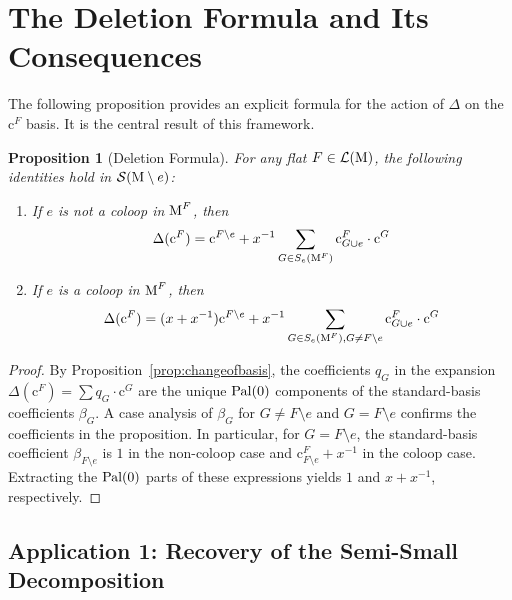 \documentclass[11pt]{article}
\newcommand{\calS}{\mathcal{S}}
\newcommand{\M}{\normalfont\text{M}}
\newcommand{\Cbasis}[1]{\mathrm{c}^{#1}}
\newcommand{\CbasisSub}[2]{\mathrm{c}^{#1}_{#2}}
\newcommand{\pal}{\normalfont\text{Pal}}
\newtheorem{proposition}[theorem]{Proposition}
\theoremstyle{remark}
\begin{document}
\section{The Deletion Formula and Its Consequences}

The following proposition provides an explicit formula for the action of \(\Delta\) on the \(\Cbasis{F}\) basis. It is the central result of this framework.

\begin{proposition}[Deletion Formula]\label{prop:imageofDeltaCbasis}
    For any flat \(F \in \mathcal{L}(\M)\), the following identities hold in \(\calS(\M \setminus e)\):
    \begin{enumerate}
        \item If \(e\) is not a coloop in \(\M^F\), then
        \begin{equation}\label{eq:imageofDeltaCbasisnoncoloop}
            \Delta(\Cbasis{F}) = \Cbasis{F \setminus e} + x^{-1}\sum_{G \in S_e(\M^F)}\CbasisSub{F}{G\cup e} \cdot \Cbasis{G}
        \end{equation}
        \item If \(e\) is a coloop in \(\M^F\), then
        \begin{equation}\label{eq:imageofDeltaCbasiscoloop}
            \Delta(\Cbasis{F}) = (x+x^{-1})\Cbasis{F \setminus e} + x^{-1}\sum_{G \in S_e(\M^F), G \neq F\setminus e}\CbasisSub{F}{G\cup e} \cdot \Cbasis{G}
        \end{equation}
    \end{enumerate}
\end{proposition}
\begin{proof}
    By Proposition~\ref{prop:changeofbasis}, the coefficients \(q_G\) in the expansion \(\Delta(\Cbasis{F}) = \sum q_G \cdot \Cbasis{G}\) are the unique \(\pal(0)\) components of the standard-basis coefficients \(\beta_G\). A case analysis of \(\beta_G\) for \(G \neq F \setminus e\) and \(G = F \setminus e\) confirms the coefficients in the proposition. In particular, for \(G=F\setminus e\), the standard-basis coefficient \(\beta_{F\setminus e}\) is \(1\) in the non-coloop case and \(\CbasisSub{F}{F\setminus e} + x^{-1}\) in the coloop case. Extracting the \(\pal(0)\) parts of these expressions yields \(1\) and \(x+x^{-1}\), respectively.
\end{proof}

\subsection{Application 1: Recovery of the Semi-Small Decomposition}
\end{document}
